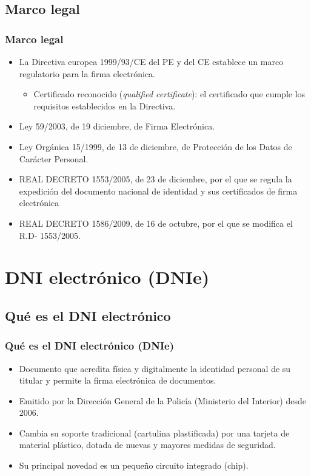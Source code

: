 \documentclass{beamer}
\begin{document}
\subsection{Marco legal}
\begin{frame}
\frametitle{Marco legal}

\begin{itemize}
\item La Directiva europea 1999/93/CE del PE y del CE establece un marco regulatorio para la firma electrónica.
	\begin{itemize}
	\item \alert{Certificado reconocido} (\textit{qualified certificate}): el certificado que cumple los requisitos establecidos en la Directiva.
	\end{itemize}
\item Ley 59/2003, de 19  diciembre, de Firma Electrónica. 
\item Ley Orgánica 15/1999, de 13 de diciembre, de Protección de los Datos de Carácter Personal.
\item REAL DECRETO 1553/2005, de 23 de diciembre, por el que se regula la expedición del documento nacional de identidad y sus certificados de firma electrónica 
\item REAL DECRETO 1586/2009, de 16 de octubre, por el que se modifica el R.D- 1553/2005. 

\end{itemize}

\end{frame}


\section{DNI electrónico (DNIe)}

\subsection{Qué es el DNI electrónico}

\begin{frame}
\frametitle{Qué es el DNI electrónico (DNIe)}


\begin{itemize}
\item Documento que acredita física y digitalmente la identidad personal de su titular y permite la firma electrónica de documentos.
\item Emitido por la Dirección General de la Policía (Ministerio del Interior) desde 2006. 
\item Cambia su soporte tradicional (cartulina plastificada) por una tarjeta de material plástico, dotada de nuevas y mayores medidas de seguridad.
\item Su principal novedad es un pequeño circuito integrado (chip).
\end{itemize}

\end{frame}
\end{document}
